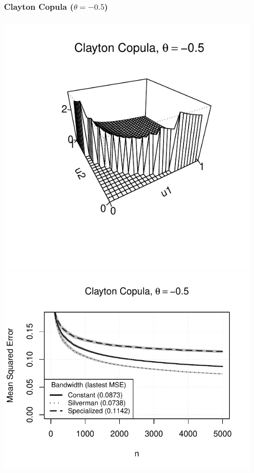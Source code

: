 \documentclass[aspectratio=169]{beamer}
\begin{document}
		\subsubsection{Clayton Copula ($ \theta = -0.5 $)}
			\begin{frame}
				\frametitle{\insertsubsubsection}
				
				\begin{flushleft}
					\includegraphics[width=0.4\linewidth]{plots/numerical_results/clayton_05}
					\includegraphics[width=0.5\linewidth]{../text/plots/experiment_results/clayton_05}
				\end{flushleft}
				
			\end{frame}
		
\end{document}
